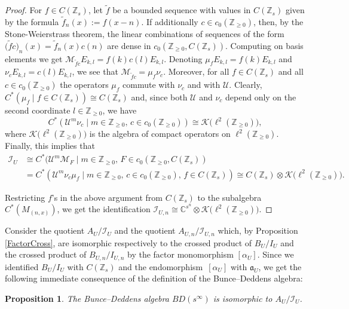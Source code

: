 \documentclass[10pt,a4paper]{amsart}
\newcommand{\C}{{\mathbb C}}
\newcommand{\Z}{{\mathbb Z}}
\newcommand{\fancyI}{\mathcal{I}}
\numberwithin{equation}{section}
\newtheorem{Proposition}[Theorem]{Proposition}
 { \theoremstyle{definition}
\newtheorem{Definition}[Theorem]{Definition}
\newtheorem{Note}[Theorem]{Note}
\newtheorem{Example}[Theorem]{Example}
\newtheorem{Remark}[Theorem]{Remark} }
\begin{document}
\begin{proof}
For $f\in C(\Z_s)$, let $\tilde f$ be a bounded sequence with values in $C(\Z_s)$ given by the formula $
\tilde f_n(x):=f(x-n)$.
If additionally $c\in c_0(\Z_{\ge0})$, then, by the Stone-Weierstrass theorem, the linear combinations of sequences of the form
$\bigl(\tilde fc\bigr)_n(x)= \tilde f_n(x)c(n)$
are dense in $c_0(\Z_{\ge0}, C(\Z_s))$. Computing on basis elements we get
$\mathcal{M}_{\tilde fc} E_{k,l} = f(k)c(l) E_{k,l}$.
Denoting $\mu_{f} E_{k,l} = f(k) E_{k,l}$ and~${ \nu_{c} E_{k,l} = c(l) E_{k,l}}$,
we see that $\mathcal{M}_{\tilde fc}=\mu_{f}\nu_{c}$. Moreover, for all $f\in C(\Z_s)$ and all $c\in c_0(\Z_{\ge0})$ the operators $\mu_f$ commute with $\nu_{c}$ and with $\mathcal{U}$. Clearly,
$C^*(\mu_f\mid f\in C(\Z_s))\cong C(\Z_s)
$
and, since both $\mathcal{U}$ and $\nu_{c}$ depend only on the second coordinate $l\in\Z_{\ge0}$, we have
\begin{equation*}
C^*(\mathcal{U}^m\nu_{c}\mid m\in \Z_{\ge0},\, c\in c_0(\Z_{\ge0}))\cong \mathcal{K}\bigl(\ell^2(\Z_{\ge0})\bigr),
\end{equation*}
where $\mathcal{K}\bigl(\ell^2(\Z_{\ge0})\bigr)$ is the algebra of compact operators on $\ell^2(\Z_{\ge0})$. Finally, this implies that
\begin{align*}
\mathcal{I}_U&\cong
C^*(\mathcal{U}^m \mathcal{M}_F\mid m\in \Z_{\ge0},\, F\in c_0(\Z_{\ge0}, C(\Z_s))\\
&=C^*(\mathcal{U}^m\nu_{c}\mu_f\mid m\in \Z_{\ge0},\, c\in c_0(\Z_{\ge0}),\, f\in C(\Z_s))\cong C(\Z_s)\otimes \mathcal{K}\bigl(\ell^2(\Z_{\ge0})\bigr).
\end{align*}

Restricting $f$'s in the above argument from $C(\Z_s)$ to the subalgebra $C^*(M_{(n,x)})$, we get the identification $\fancyI_{U,n}\cong \C^{s^n}\otimes \mathcal{K}\bigl(\ell^2(\Z_{\ge0})\bigr)$.
\end{proof}

Consider the quotient $A_U/\mathcal{I}_U$ and the quotient $A_{U,n}/\fancyI_{U,n}$ which, by Proposition \ref{FactorCross}, are isomorphic respectively to the crossed product of $B_U/I_U$ and the crossed product of $B_{U,n}/I_{U,n}$ by the factor monomorphism $[\alpha_U]$. Since we identified $B_U/I_U$ with $C(\Z_s)$ and the endomorphism~$[\alpha_U]$ with $\mathfrak{a}_U$, we get the following immediate consequence of the definition of the Bunce--Deddens algebra:
\begin{Proposition}\label{UAlgebraQuotient}
The Bunce--Deddens algebra $BD(s^\infty)$ is isomorphic to $A_U/\mathcal{I}_U$.
\end{Proposition}
\end{document}
